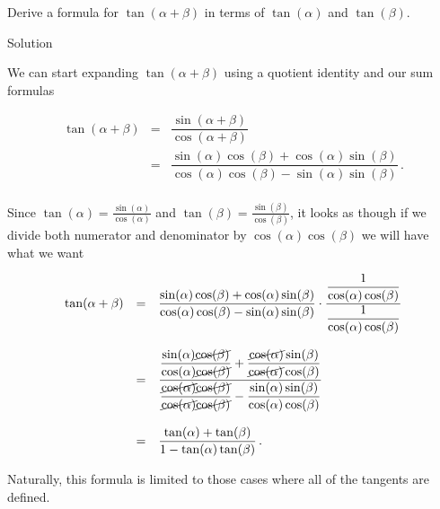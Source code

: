 \begin{example}
\label{exampletangent}

 Derive a formula for $\tan(\alpha + \beta)$ in terms of $\tan(\alpha)$ and $\tan(\beta)$.

Solution 

We can start expanding $\tan(\alpha + \beta)$ using a quotient identity and our sum formulas

\vspace{-.1in}

\[ \begin{array}{rcl}

\tan(\alpha + \beta) & = & \dfrac{\sin(\alpha + \beta)}{\cos(\alpha + \beta)} \\ [10pt]
                     & = & \dfrac{\sin(\alpha) \cos(\beta) + \cos(\alpha) \sin(\beta)}{\cos(\alpha) \cos(\beta) - \sin(\alpha) \sin(\beta)}\,. \\ \end{array} \]
			

Since  $\tan(\alpha) = \frac{\sin(\alpha)}{\cos(\alpha)}$ and $\tan(\beta) = \frac{\sin(\beta)}{\cos(\beta)}$, it looks as though if we divide both numerator and denominator by $\cos(\alpha) \cos(\beta)$ we will have what we want

\vspace{-.1in}
\allowdisplaybreaks
\[ \begin{array}{rcl}

\tan(\alpha + \beta) & = & \dfrac{\sin(\alpha) \cos(\beta) + \cos(\alpha) \sin(\beta)}{\cos(\alpha) \cos(\beta) - \sin(\alpha) \sin(\beta)} \cdot\dfrac{\dfrac{1}{\cos(\alpha) \cos(\beta)}}{\dfrac{1}{\cos(\alpha) \cos(\beta)}}\\
                    &   & \\
										& = & \dfrac{\dfrac{\sin(\alpha) \cancel{\cos(\beta)}}{\cos(\alpha) \cancel{\cos(\beta)}} + \dfrac{\cancel{\cos(\alpha)} \sin(\beta)}{\cancel{\cos(\alpha)} \cos(\beta)}}{\dfrac{\cancel{\cos(\alpha)} \cancel{\cos(\beta)}}{\cancel{\cos(\alpha)} \cancel{\cos(\beta)}} - \dfrac{\sin(\alpha) \sin(\beta)}{\cos(\alpha) \cos(\beta)}}\\
                    &   & \\
										& = & \dfrac{\tan(\alpha) + \tan(\beta)}{1 -\tan(\alpha) \tan(\beta)}\,.\\
\end{array} \]

Naturally, this formula is limited to those cases where all of the tangents are defined.
\end{example}


